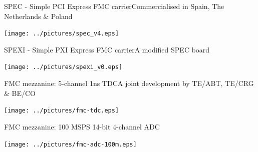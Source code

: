 \documentclass[compress,red]{beamer}
\begin{document}
\begin{frame}{SPEC - Simple PCI Express FMC carrier}{Commercialised in Spain, The Netherlands \& Poland}

  \begin{center}
    \texttt{[image: ../pictures/spec\_v4.eps]}
  \end{center}

  \note[item]{}

\end{frame}

\begin{frame}{SPEXI - Simple PXI Express FMC carrier}{A modified SPEC board}

  \begin{center}
    \texttt{[image: ../pictures/spexi\_v0.eps]}
  \end{center}

  \note[item]{}

\end{frame}

\begin{frame}{FMC mezzanine: 5-channel 1ns TDC}{A joint development by TE/ABT, TE/CRG \& BE/CO}

  \begin{center}
    \texttt{[image: ../pictures/fmc-tdc.eps]}
  \end{center}

  \note[item]{}

\end{frame}

\begin{frame}{FMC mezzanine: 100 MSPS 14-bit 4-channel ADC}

  \begin{center}
    \texttt{[image: ../pictures/fmc-adc-100m.eps]}
  \end{center}

  \note[item]{}

\end{frame}
\end{document}
